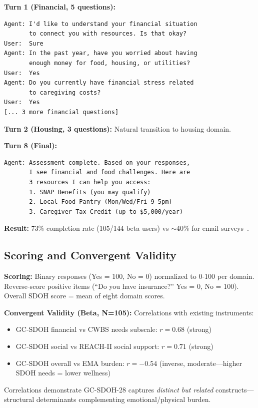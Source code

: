 \documentclass{article}%
\begin{document}
\textbf{Turn 1 (Financial, 5 questions):}
\begin{verbatim}
Agent: I'd like to understand your financial situation
       to connect you with resources. Is that okay?
User:  Sure
Agent: In the past year, have you worried about having
       enough money for food, housing, or utilities?
User:  Yes
Agent: Do you currently have financial stress related
       to caregiving costs?
User:  Yes
[... 3 more financial questions]
\end{verbatim}

\textbf{Turn 2 (Housing, 3 questions):} Natural transition to housing domain.

\textbf{Turn 8 (Final):}
\begin{verbatim}
Agent: Assessment complete. Based on your responses,
       I see financial and food challenges. Here are
       3 resources I can help you access:
       1. SNAP Benefits (you may qualify)
       2. Local Food Pantry (Mon/Wed/Fri 9-5pm)
       3. Caregiver Tax Credit (up to $5,000/year)
\end{verbatim}

\textbf{Result:} 73\% completion rate (105/144 beta users) vs $\sim$40\% for email surveys~\cite{fan2006}.

%
\subsection{Scoring and Convergent Validity}%
\label{subsec:ScoringandConvergentValidity}%
\textbf{Scoring:} Binary responses (Yes = 100, No = 0) normalized to 0-100 per domain. Reverse-score positive items (``Do you have insurance?'' Yes = 0, No = 100). Overall SDOH score = mean of eight domain scores.

\textbf{Convergent Validity (Beta, N=105):} Correlations with existing instruments:
\begin{itemize}
    \item GC-SDOH financial vs CWBS needs subscale: $r = 0.68$ (strong)
    \item GC-SDOH social vs REACH-II social support: $r = 0.71$ (strong)
    \item GC-SDOH overall vs EMA burden: $r = -0.54$ (inverse, moderate—higher SDOH needs = lower wellness)
\end{itemize}

Correlations demonstrate GC-SDOH-28 captures \textit{distinct but related} constructs—structural determinants complementing emotional/physical burden.
\end{document}
